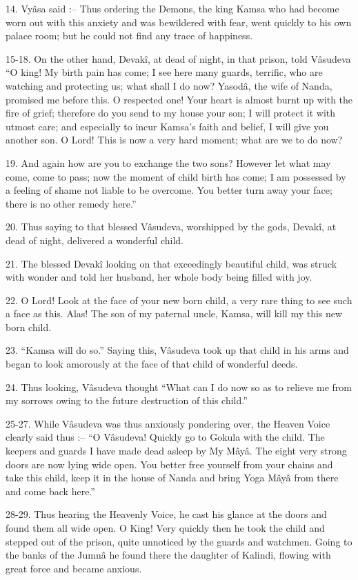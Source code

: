 14. Vy\^asa said :-- Thus ordering the Demons, the king Kamsa who had become worn out with this anxiety and was bewildered with fear, went quickly to his own palace room; but he could not find any trace of happiness.

15-18. On the other hand, Devak\^i, at dead of night, in that prison, told V\^asudeva ``O king! My birth pain has come; I see here many guards, terrific, who are watching and protecting us; what shall I do now? Yasod\^a, the wife of Nanda, promised me before this. O respected one! Your heart is almost burnt up with the fire of grief; therefore do you send to my house your son; I will protect it with utmost care; and especially to incur Kamsa's faith and belief, I will give you another son. O Lord! This is now a very hard moment; what are we to do now?

19. And again how are you to exchange the two sons? However let what may come, come to pass; now the moment of child birth has come; I am possessed by a feeling of shame not liable to be overcome. You better turn away your face; there is no other remedy here.''

20. Thus saying to that blessed V\^asudeva, worshipped by the gods, Devak\^i, at dead of night, delivered a wonderful child.

21. The blessed Devak\^i looking on that exceedingly beautiful child, was struck with wonder and told her husband, her whole body being filled with joy.

22. O Lord! Look at the face of your new born child, a very rare thing to see such a face as this. Alas! The son of my paternal uncle, Kamsa, will kill my this new born child.

23. ``Kamsa will do so.'' Saying this, V\^asudeva took up that child in his arms and began to look amorously at the face of that child of wonderful deeds.

24. Thus looking, V\^asudeva thought ``What can I do now so as to relieve me from my sorrows owing to the future destruction of this child.''

25-27. While V\^asudeva was thus anxiously pondering over, the Heaven Voice clearly said thus :-- ``O V\^asudeva! Quickly go to Gokula with the child. The keepers and guards I have made dead asleep by My M\^ay\^a. The eight very strong doors are now lying wide open. You better free yourself from your chains and take this child, keep it in the house of Nanda and bring Yoga M\^ay\^a from there and come back here.''

28-29. Thus hearing the Heavenly Voice, he cast his glance at the doors and found them all wide open. O King! Very quickly then he took the child and stepped out of the prison, quite unnoticed by the guards and watchmen. Going to the banks of the Jumn\^a he found there the daughter of Kalindi, flowing with great force and became anxious.

